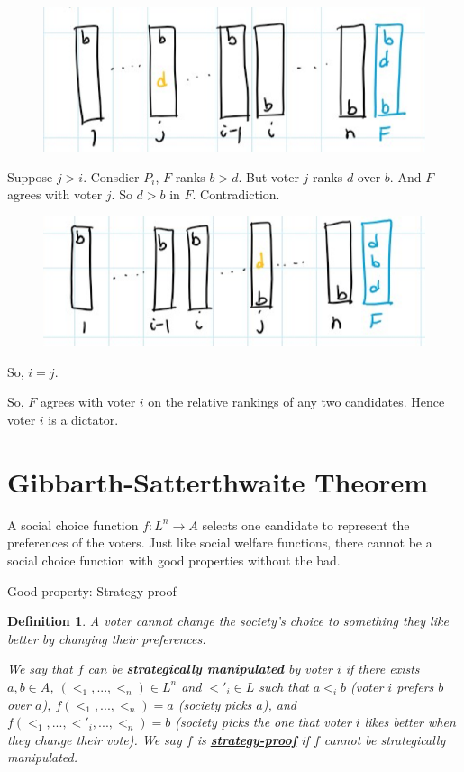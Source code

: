 \documentclass[twoside]{article}
\newtheorem{protodefinition}[prototheorem]{Definition}
\newenvironment{definition}
{\colorlet{shadecolor}{cyan!15}\begin{shaded}\begin{protodefinition}\normalfont}
		{\end{protodefinition}\end{shaded}}
\begin{document}
\begin{enumerate}
		      \begin{center}
		      	\begin{figure}[h!]
		      		\includegraphics[width=.6\textwidth]{voting_4.png}
		      	\end{figure}
		      \end{center}
		      
		      Suppose $j > i$. Consdier $P_i$, $F$ ranks $b > d$. But voter $j$ ranks $d$ over $b$. And $F$ agrees with voter $j$. So $d > b$ in $F$. Contradiction. 
		      \begin{center}
		      	\begin{figure}[h!]
		      		\includegraphics[width=.6\textwidth]{voting_5.png}
		      	\end{figure}
		      \end{center}
		      
		      So, $i = j$. 
	\end{enumerate}
	
	So, $F$ agrees with voter $i$ on the relative rankings of any two candidates. Hence voter $i$ is a dictator. 
	
	\section{Gibbarth-Satterthwaite Theorem}
	A social choice function $f: L^n \rightarrow A$ selects one candidate to represent the preferences of the voters. Just like social welfare functions, there cannot be a social choice function with good properties without the bad. 
	
	Good property: Strategy-proof
	
	\begin{definition}
		A voter cannot change the society's choice to something they like better by changing their preferences. 
			
		We say that $f$ can be \textbf{\underline{strategically manipulated}} by voter $i$ if there exists $a, b \in A$, $(<_1, ..., <_n) \in L^n$ and $<'_i \in L$ such that $a <_i b$ (voter $i$ prefers $b$ over $a$), $f(<_1, ..., <_n) = a$ (society picks $a$), and $f(<_1, ..., <'_i, ..., <_n) = b$ (society picks the one that voter $i$ likes better when they change their vote). We say $f$ is \textbf{\underline{strategy-proof}} if $f$ cannot be strategically manipulated. 
	\end{definition}
	
\end{document}
